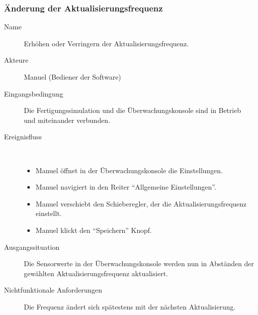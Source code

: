\documentclass[parskip=full]{scrartcl}
\begin{document}
\subsubsection{Änderung der Aktualisierungsfrequenz}
\begin{description}
 \item[Name] Erhöhen oder Verringern der Aktualisierungsfrequenz.
 \item[Akteure] Manuel (Bediener der Software)
 \item[Eingangsbedingung] Die Fertigungssimulation und die Überwachungskonsole sind in Betrieb und miteinander verbunden.
 \item[Ereignisfluss]~\\
 \begin{itemize}[noitemsep]
  \item Manuel öffnet in der Überwachungskonsole die Einstellungen.
  \item Manuel navigiert in den Reiter "`Allgemeine Einstellungen"'.
  \item Manuel verschiebt den Schieberegler, der die Aktualisierungsfrequenz einstellt.
  \item Manuel klickt den "`Speichern"' Knopf.
 \end{itemize}
 \item[Ausgangssituation] Die Sensorwerte in der Überwachungskonsole werden nun in Abständen der gewählten Aktualisierungsfrequenz aktualisiert.
 \item [Nichtfunktionale Anforderungen] Die Frequenz ändert sich spätestens mit der nächsten Aktualisierung.
\end{description}
\end{document}
